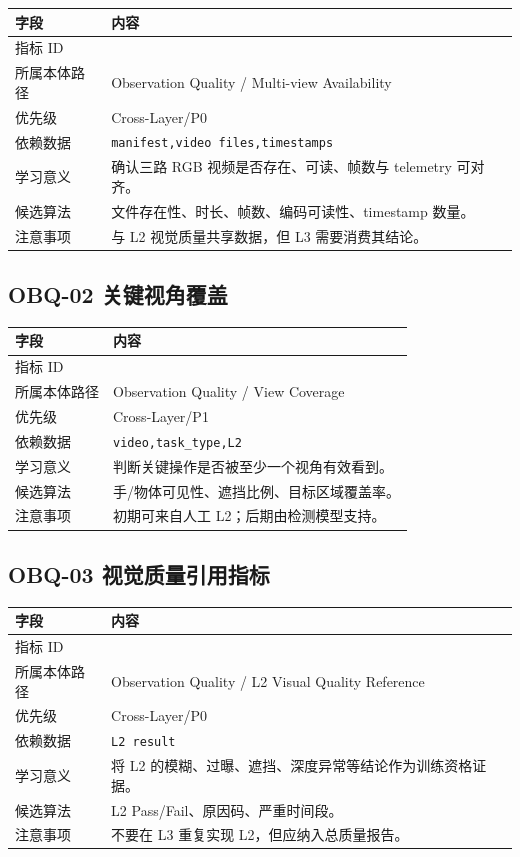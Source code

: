 \documentclass[UTF8,zihao=-4,oneside,openany]{ctexrep}
\newcommand{\Code}[1]{\texttt{#1}}
\newcommand{\MID}[1]{\texttt{\seqsplit{#1}}}
\begin{document}
\begin{longtable}{L{3.6cm} L{9.6cm}}
\toprule
字段 & 内容 \\
\midrule
指标 ID & \MID{OBQ-01} \\
所属本体路径 & Observation Quality / Multi-view Availability \\
优先级 & Cross-Layer/P0 \\
依赖数据 & \Code{manifest,video files,timestamps} \\
学习意义 & 确认三路 RGB 视频是否存在、可读、帧数与 telemetry 可对齐。 \\
候选算法 & 文件存在性、时长、帧数、编码可读性、timestamp 数量。 \\
注意事项 & 与 L2 视觉质量共享数据，但 L3 需要消费其结论。 \\
\bottomrule
\end{longtable}

\subsection{OBQ-02 关键视角覆盖}

\begin{longtable}{L{3.6cm} L{9.6cm}}
\toprule
字段 & 内容 \\
\midrule
指标 ID & \MID{OBQ-02} \\
所属本体路径 & Observation Quality / View Coverage \\
优先级 & Cross-Layer/P1 \\
依赖数据 & \Code{video,task\_type,L2} \\
学习意义 & 判断关键操作是否被至少一个视角有效看到。 \\
候选算法 & 手/物体可见性、遮挡比例、目标区域覆盖率。 \\
注意事项 & 初期可来自人工 L2；后期由检测模型支持。 \\
\bottomrule
\end{longtable}

\subsection{OBQ-03 视觉质量引用指标}

\begin{longtable}{L{3.6cm} L{9.6cm}}
\toprule
字段 & 内容 \\
\midrule
指标 ID & \MID{OBQ-03} \\
所属本体路径 & Observation Quality / L2 Visual Quality Reference \\
优先级 & Cross-Layer/P0 \\
依赖数据 & \Code{L2 result} \\
学习意义 & 将 L2 的模糊、过曝、遮挡、深度异常等结论作为训练资格证据。 \\
候选算法 & L2 Pass/Fail、原因码、严重时间段。 \\
注意事项 & 不要在 L3 重复实现 L2，但应纳入总质量报告。 \\
\bottomrule
\end{longtable}
\end{document}
